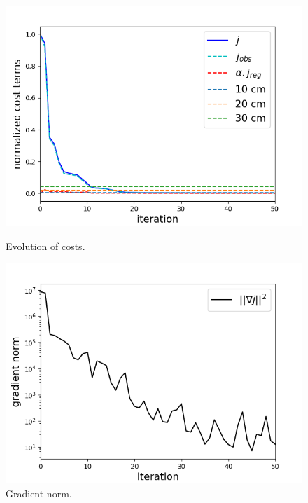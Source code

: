 \documentclass{article}
\begin{document}
\begin{figure}[H]
    \centering
    \begin{minipage}[b]{0.48\linewidth}
        \centering
        \includegraphics[width=\linewidth]{Images_Ayoub/h_connue/Costs.png}
        \caption{Evolution of costs.}
        \label{fig:hconnue-costs}
    \end{minipage}
    \hfill
    \begin{minipage}[b]{0.48\linewidth}
        \centering
        \includegraphics[width=\linewidth]{Images_Ayoub/h_connue/Gradient.png}
        \caption{Gradient norm.}
        \label{fig:hconnue-gradient}
    \end{minipage}
    

\end{figure}
\end{document}
